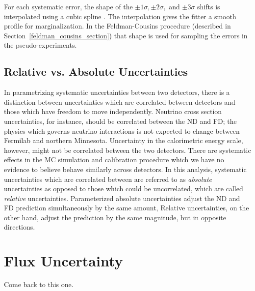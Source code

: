 For each systematic error, the shape of the
$\pm 1\sigma, \pm2\sigma,$ and
$\pm3\sigma$ shifts is interpolated using a cubic spline
\cite{atkinson1978introduction}.
The interpolation gives the fitter a smooth profile for marginalization.
In the Feldman-Cousins procedure \cite{feldman1998unified} (described
in Section~\ref{feldman_cousins_section}) that shape
is used for sampling the errors in the pseudo-experiments.

\subsection{Relative vs. Absolute Uncertainties}

In parametrizing systematic uncertainties between two detectors,
there is a distinction between uncertainties which are
correlated between detectors and those which have freedom to
move independently.
Neutrino cross section uncertainties, for instance, should be correlated
between the ND and FD; the physics which governs neutrino interactions
is not expected to change between Fermilab and northern Minnesota.
Uncertainty in the calorimetric energy scale, however,
might not be correlated between the two detectors.
There are systematic effects in the MC simulation and calibration procedure
which we have no evidence to believe behave similarly across
detectors.
In this analysis, systematic uncertainties which are correlated between
are referred to as \textit{absolute} uncertainties as opposed to
those which could be uncorrelated, which are called \textit{relative}
uncertainties.
Parameterized absolute uncertainties adjust the ND and FD prediction
simultaneously by the same amount,
Relative uncertainties, on the other hand, adjust the prediction by
the same magnitude, but in opposite directions.


\section{Flux Uncertainty}
\label{flux_syst_section}

Come back to this one.


